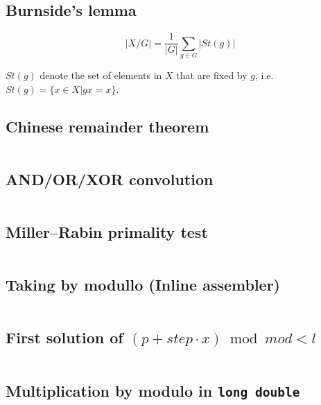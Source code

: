 \documentclass{article}
\begin{document}
\subsection{Burnside's lemma}
$$|X/G| = \frac{1}{|G|}\sum\limits_{g \in G}|St(g)|$$

$St(g)$ denote the set of elements in $X$ that are fixed by $g$, i.e. $St(g) = \{x \in X | gx = x\}$.
\subsection{Chinese remainder theorem}
\inputminted[mathescape, breaklines, breakafter=(, tabsize=2, frame=lines, showtabs, tab=|\ , tabcolor=lightgray]{c++}{./numeric/chinese-remainder-theorem/chinese-remainder-theorem.cpp}
\subsection{AND/OR/XOR convolution}
\inputminted[mathescape, breaklines, breakafter=(, tabsize=2, frame=lines, showtabs, tab=|\ , tabcolor=lightgray]{c++}{./numeric/convolutions/convolutions.cpp}
\subsection{Miller–Rabin primality test}
\inputminted[mathescape, breaklines, breakafter=(, tabsize=2, frame=lines, showtabs, tab=|\ , tabcolor=lightgray]{c++}{./numeric/miller-rabin/miller-rabin.cpp}
\subsection{Taking by modullo (Inline assembler)}
\inputminted[mathescape, breaklines, breakafter=(, tabsize=2, frame=lines, showtabs, tab=|\ , tabcolor=lightgray]{c++}{./numeric/mod-asm/mod-asm.cpp}
\subsection{First solution of $(p + step \cdot x) \bmod mod < l$}
\inputminted[mathescape, breaklines, breakafter=(, tabsize=2, frame=lines, showtabs, tab=|\ , tabcolor=lightgray]{c++}{./numeric/mod-ineq-first-sol/mod-ineq-first-sol.cpp}
\subsection{Multiplication by modulo in \texttt{long double}}
\inputminted[mathescape, breaklines, breakafter=(, tabsize=2, frame=lines, showtabs, tab=|\ , tabcolor=lightgray]{c++}{./numeric/mult-by-mod/mult-by-mod.cpp}
\end{document}
